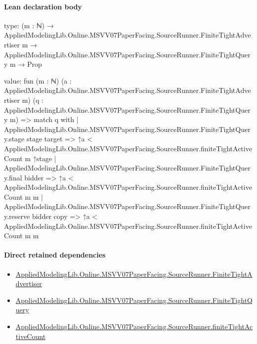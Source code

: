 \documentclass[10pt]{article}
\begin{document}
\paragraph{Lean declaration body}
\begin{ReviewVerbatim}
type:
(m : ℕ) →
  AppliedModelingLib.Online.MSVV07PaperFacing.SourceRunner.FiniteTightAdvertiser m →
    AppliedModelingLib.Online.MSVV07PaperFacing.SourceRunner.FiniteTightQuery m → Prop

value:
fun (m : ℕ) (a : AppliedModelingLib.Online.MSVV07PaperFacing.SourceRunner.FiniteTightAdvertiser m)
    (q : AppliedModelingLib.Online.MSVV07PaperFacing.SourceRunner.FiniteTightQuery m) =>
  match q with
  | AppliedModelingLib.Online.MSVV07PaperFacing.SourceRunner.FiniteTightQuery.stage stage target =>
    ↑a < AppliedModelingLib.Online.MSVV07PaperFacing.SourceRunner.finiteTightActiveCount m ↑stage
  | AppliedModelingLib.Online.MSVV07PaperFacing.SourceRunner.FiniteTightQuery.final bidder =>
    ↑a < AppliedModelingLib.Online.MSVV07PaperFacing.SourceRunner.finiteTightActiveCount m m
  | AppliedModelingLib.Online.MSVV07PaperFacing.SourceRunner.FiniteTightQuery.reserve bidder copy =>
    ↑a < AppliedModelingLib.Online.MSVV07PaperFacing.SourceRunner.finiteTightActiveCount m m
\end{ReviewVerbatim}

\paragraph{Direct retained dependencies}
\begin{itemize}\raggedright
\item \hyperlink{governing-declaration-48ee018f3cdad0d9}{Applied\allowbreak{}Modeling\allowbreak{}Lib.\allowbreak{}Online.\allowbreak{}MSVV07\allowbreak{}Paper\allowbreak{}Facing.\allowbreak{}Source\allowbreak{}Runner.\allowbreak{}Finite\allowbreak{}Tight\allowbreak{}Advertiser}
\item \hyperlink{governing-declaration-feae64ffc2ccaca7}{Applied\allowbreak{}Modeling\allowbreak{}Lib.\allowbreak{}Online.\allowbreak{}MSVV07\allowbreak{}Paper\allowbreak{}Facing.\allowbreak{}Source\allowbreak{}Runner.\allowbreak{}Finite\allowbreak{}Tight\allowbreak{}Query}
\item \hyperlink{governing-declaration-a821db3d53d0e450}{Applied\allowbreak{}Modeling\allowbreak{}Lib.\allowbreak{}Online.\allowbreak{}MSVV07\allowbreak{}Paper\allowbreak{}Facing.\allowbreak{}Source\allowbreak{}Runner.\allowbreak{}finite\allowbreak{}Tight\allowbreak{}Active\allowbreak{}Count}
\end{itemize}
\hypertarget{governing-declaration-9112aa03d43a6903}{}
\end{document}
